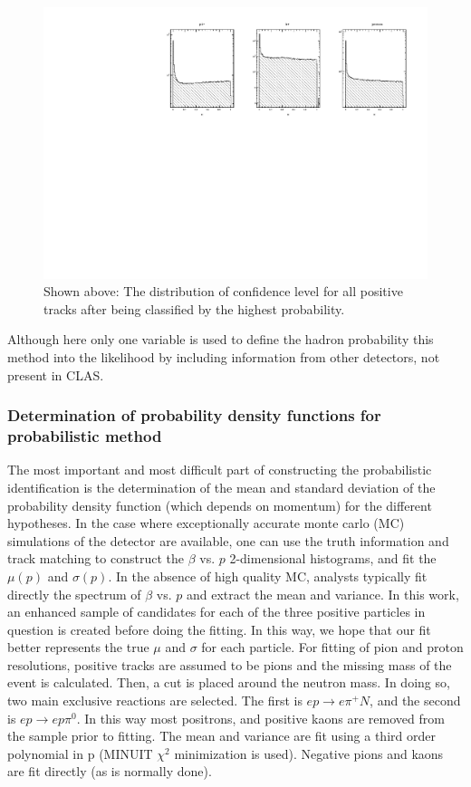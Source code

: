 \begin{figure}
  \begin{center}
    \includegraphics[width=14cm]{image/plots/hadron-id/confidence_level.pdf}
    \caption{ Shown above: The distribution of confidence level for all positive tracks after being classified by the highest probability.}
  \end{center}
\end{figure}

Although here only one variable is used to define the hadron probability this method into the likelihood by including information from other detectors, not present in CLAS. 

\subsubsection{Determination of probability density functions for probabilistic method}

The most important and most difficult part of constructing the probabilistic identification is the determination of the mean and standard deviation of the probability density function (which depends on momentum) for the different hypotheses.  In the case where exceptionally accurate monte carlo (MC) simulations of the detector are available, one can use the truth information and track matching to construct the $\beta$ vs. $p$ 2-dimensional histograms, and fit the $\mu(p)$ and $\sigma(p)$.  In the absence of high quality MC, analysts typically fit directly the spectrum of $\beta$ vs. $p$ and extract the mean and variance.  In this work, an enhanced sample of candidates for each of the three positive particles in question is created before doing the fitting.  In this way, we hope that our fit better represents the true $\mu$ and $\sigma$ for each particle.  For fitting of pion and proton resolutions, positive tracks are assumed to be pions and the missing mass of the event is calculated.  Then, a cut is placed around the neutron mass.  In doing so, two main exclusive reactions are selected.  The first is $ep \rightarrow e\pi^+N$, and the second is $ep \rightarrow ep\pi^0$.  In this way most positrons, and positive kaons are removed from the sample prior to fitting.  The mean and variance are fit using a third order polynomial in p (MINUIT $\chi^2$ minimization is used).  Negative pions and kaons are fit directly (as is normally done).

